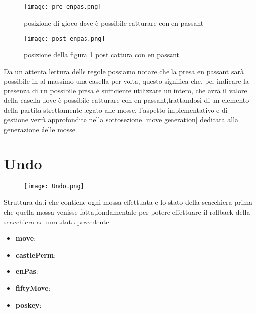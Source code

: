 \begin{figure}[H]
    \centering
    \begin{minipage}[b]{0.4\textwidth}
        \texttt{[image: pre\_enpas.png]}
        \caption{posizione di gioco dove è possibile catturare con en passant}
        \label{pre_enpas}
    \end{minipage}
    \hfill
    \begin{minipage}[b]{0.4\textwidth}
        \texttt{[image: post\_enpas.png]}
        \caption{posizione della figura \ref{pre_enpas} post cattura con en passant}
    \end{minipage}
\end{figure}
Da un attenta lettura delle regole possiamo notare che la presa en passant sarà possibile in al massimo una casella per volta,
questo significa che, per indicare la presenza di un possibile presa è sufficiente utilizzare un intero, che avrà il valore della casella dove è
possibile catturare con en passant,trattandosi di un elemento della partita strettamente legato alle mosse, l'aspetto implementativo e di gestione verrà approfondito nella sottosezione \ref{move generation} dedicata alla generazione delle mosse


\section{Undo}
\label{undo}
\begin{figure}[H]
    \centering
    \texttt{[image: Undo.png]}
\end{figure}
Struttura dati che contiene ogni mossa effettuata e lo stato della scacchiera prima che quella mossa venisse fatta,fondamentale per potere effettuare
il rollback della scacchiera ad uno stato precedente:
\begin{itemize}
    \item   \textbf{move}:
    \item   \textbf{castlePerm}:
    \item   \textbf{enPas}:
    \item   \textbf{fiftyMove}:
    \item   \textbf{poskey}:
\end{itemize}
